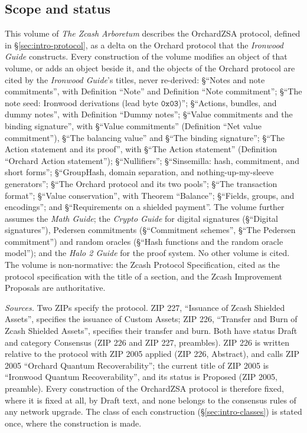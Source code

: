 \documentclass[11pt,a4paper]{article}
\theoremstyle{definition}
\begin{document}
\subsection{Scope and status}\label{sec:intro-scope}

This volume of \emph{The Zcash Arboretum} describes the OrchardZSA protocol,
defined in \S\ref{sec:intro-protocol}, as a delta on the Orchard protocol
that the \emph{Ironwood Guide} constructs. Every construction of the volume
modifies an object of that volume, or adds an object beside it, and the
objects of the Orchard protocol are cited by the \emph{Ironwood Guide}'s
titles, never re-derived: \S``Notes and note commitments'', with Definition
``Note'' and Definition ``Note commitment''; \S``The note seed: Ironwood
derivations (lead byte $\mathtt{0x03}$)''; \S``Actions, bundles, and dummy
notes'', with Definition ``Dummy notes''; \S``Value commitments and the
binding signature'', with \S``Value commitments'' (Definition ``Net value
commitment''), \S``The balancing value'' and \S``The binding signature'';
\S``The Action statement and its proof'', with \S``The Action statement''
(Definition ``Orchard Action statement''); \S``Nullifiers''; \S``Sinsemilla:
hash, commitment, and short forms''; \S``GroupHash, domain separation, and
nothing-up-my-sleeve generators''; \S``The Orchard protocol and its two
pools''; \S``The transaction format''; \S``Value conservation'', with
Theorem ``Balance''; \S``Fields, groups, and encodings''; and
\S``Requirements on a shielded payment''. The volume further assumes the
\emph{Math Guide}; the \emph{Crypto Guide} for digital signatures
(\S``Digital signatures''), Pedersen commitments (\S``Commitment schemes'',
\S``The Pedersen commitment'') and random oracles (\S``Hash functions and
the random oracle model''); and the \emph{Halo 2 Guide} for the proof
system. No other volume is cited. The volume is non-normative: the Zcash
Protocol Specification, cited as the protocol specification with the title
of a section, and the Zcash Improvement Proposals are authoritative.

\emph{Sources.} Two ZIPs specify the protocol. ZIP 227, ``Issuance of Zcash
Shielded Assets'', specifies the issuance of Custom Assets; ZIP 226,
``Transfer and Burn of Zcash Shielded Assets'', specifies their transfer and
burn. Both have status Draft and category Consensus (ZIP 226 and ZIP 227,
preambles). ZIP 226 is written relative to the protocol with ZIP 2005
applied (ZIP 226, Abstract), and calls ZIP 2005 ``Orchard Quantum
Recoverability''; the current title of ZIP 2005 is ``Ironwood Quantum
Recoverability'', and its status is Proposed (ZIP 2005, preamble). Every
construction of the OrchardZSA protocol is therefore fixed, where it is
fixed at all, by Draft text, and none belongs to the consensus rules of any
network upgrade. The class of each construction
(\S\ref{sec:intro-classes}) is stated once, where the construction is made.
\end{document}
